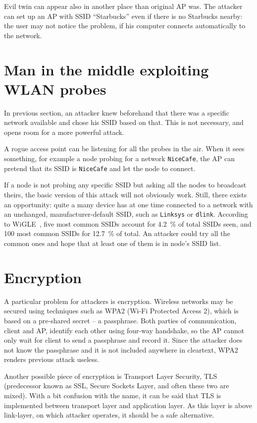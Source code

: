\documentclass[12pt,a4paper,oneside,pdftex]{report}
\begin{document}
Evil twin can appear also in another place than original AP was. The attacker can set up an AP with SSID ``Starbucks'' even if there is no Starbucks nearby: the user may not notice the problem, if his computer connects automatically to the network.

\section{Man in the middle exploiting WLAN probes}
\label{sec:mitm_probes}

In previous section, an attacker knew beforehand that there was a specific network available and chose his SSID based on that. This is not necessary, and opens room for a more powerful attack.

A rogue access point can be listening for all the probes in the air. When it sees something, for example a node probing for a network \texttt{NiceCafe}, the AP can pretend that its SSID is \texttt{NiceCafe} and let the node to connect.

If a node is not probing any specific SSID but asking all the nodes to broadcast theirs, the basic version of this attack will not obviously work. Still, there exists an opportunity: quite a many device has at one time connected to a network with an unchanged, manufacturer-default SSID, such as \texttt{Linksys} or \texttt{dlink}. According to WiGLE~\cite{wigle}, five most common SSIDs account for 4.2~\% of total SSIDs seen, and 100 most common SSIDs for 12.7~\% of total. An attacker could try all the common ones and hope that at least one of them is in node's SSID list.

\section{Encryption}
\label{sec:attack_encryption}

A particular problem for attackers is encryption. Wireless networks may be secured using techniques such as WPA2 (Wi-Fi Protected Access 2), which is based on a pre-shared secret -- a passphrase. Both parties of communication, client and AP, identify each other using four-way handshake, so the AP cannot only wait for client to send a passphrase and record it. Since the attacker does not know the passphrase and it is not included anywhere in cleartext, WPA2 renders previous attack useless.

Another possible piece of encryption is Transport Layer Security, TLS (predecessor known as SSL, Secure Sockets Layer, and often these two are mixed). With a bit confusion with the name, it can be said that TLS is implemented between transport layer and application layer. As this layer is above link-layer, on which attacker operates, it should be a safe alternative.
\end{document}
